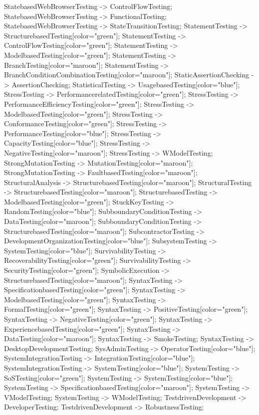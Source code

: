 \documentclass{article}
\begin{document}
{StatebasedWebBrowserTesting -> ControlFlowTesting;
StatebasedWebBrowserTesting -> FunctionalTesting;
StatebasedWebBrowserTesting -> StateTransitionTesting;
StatementTesting -> StructurebasedTesting[color="green"];
StatementTesting -> ControlFlowTesting[color="green"];
StatementTesting -> ModelbasedTesting[color="green"];
StatementTesting -> BranchTesting[color="maroon"];
StatementTesting -> BranchConditionCombinationTesting[color="maroon"];
StaticAssertionChecking -> AssertionChecking;
StatisticalTesting -> UsagebasedTesting[color="blue"];
StressTesting -> PerformancerelatedTesting[color="green"];
StressTesting -> PerformanceEfficiencyTesting[color="green"];
StressTesting -> ModelbasedTesting[color="green"];
StressTesting -> ConformanceTesting[color="green"];
StressTesting -> PerformanceTesting[color="blue"];
StressTesting -> CapacityTesting[color="blue"];
StressTesting -> NegativeTesting[color="maroon"];
StressTesting -> WModelTesting;
StrongMutationTesting -> MutationTesting[color="maroon"];
StrongMutationTesting -> FaultbasedTesting[color="maroon"];
StructuralAnalysis -> StructurebasedTesting[color="maroon"];
StructuralTesting -> StructurebasedTesting[color="maroon"];
StructurebasedTesting -> ModelbasedTesting[color="green"];
StuckKeyTesting -> RandomTesting[color="blue"];
SubboundaryConditionTesting -> DataTesting[color="maroon"];
SubboundaryConditionTesting -> StructurebasedTesting[color="maroon"];
SubcontractorTesting -> DevelopmentOrganizationTesting[color="blue"];
SubsystemTesting -> SystemTesting[color="blue"];
SurvivabilityTesting -> RecoverabilityTesting[color="green"];
SurvivabilityTesting -> SecurityTesting[color="green"];
SymbolicExecution -> StructurebasedTesting[color="maroon"];
SyntaxTesting -> SpecificationbasedTesting[color="green"];
SyntaxTesting -> ModelbasedTesting[color="green"];
SyntaxTesting -> FormalTesting[color="green"];
SyntaxTesting -> PositiveTesting[color="green"];
SyntaxTesting -> NegativeTesting[color="green"];
SyntaxTesting -> ExperiencebasedTesting[color="green"];
SyntaxTesting -> DataTesting[color="maroon"];
SyntaxTesting -> SmokeTesting;
SyntaxTesting -> DesktopDevelopmentTesting;
SysAdminTesting -> OperatorTesting[color="blue"];
SystemIntegrationTesting -> IntegrationTesting[color="blue"];
SystemIntegrationTesting -> SystemTesting[color="blue"];
SystemTesting -> SoSTesting[color="green"];
SystemTesting -> SystemTesting[color="blue"];
SystemTesting -> SpecificationbasedTesting[color="maroon"];
SystemTesting -> VModelTesting;
SystemTesting -> WModelTesting;
TestdrivenDevelopment -> DeveloperTesting;
TestdrivenDevelopment -> RobustnessTesting;
}
\end{document}
